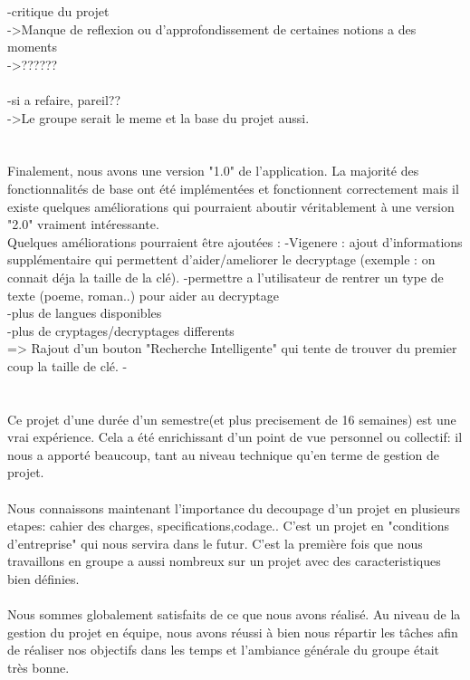 \documentclass[a4]{article}
\begin{document}
	-critique du projet \\
	->Manque de reflexion ou d'approfondissement de certaines notions a des moments \\
	->?????? \\ \\
	
	
		
	-si a refaire, pareil?? \\
	->Le groupe serait le meme et la base du projet aussi. \\ \\ \\
	
	
	Finalement, nous avons une version "1.0" de l’application. La majorité des fonctionnalités
de base ont été implémentées et fonctionnent correctement mais il existe quelques
améliorations qui pourraient aboutir véritablement à une version "2.0" vraiment intéressante. \\
Quelques améliorations pourraient être ajoutées :
-Vigenere : ajout d'informations supplémentaire qui permettent d'aider/ameliorer le decryptage 
(exemple : on connait déja la taille de la clé).
-permettre a l'utilisateur de rentrer un type de texte (poeme, roman..) pour aider au decryptage \\
-plus de langues disponibles \\
-plus de cryptages/decryptages differents \\
=> Rajout d'un bouton "Recherche Intelligente" qui tente de trouver du premier coup la taille de clé.
-\\ \\ \\

	
	
Ce projet d'une durée d'un semestre(et plus precisement de 16 semaines) est une vrai expérience.
Cela a été enrichissant d'un point de vue personnel ou collectif:
il nous a apporté beaucoup, tant au
niveau technique qu’en terme de gestion de projet.  \\  \\
Nous connaissons maintenant l'importance du decoupage d'un projet en plusieurs etapes: cahier des charges, specifications,codage..
C'est un projet en "conditions d'entreprise" qui nous servira dans le futur.
C’est la première fois que nous travaillons en groupe a aussi nombreux sur un projet avec des caracteristiques bien définies. \\ \\
Nous sommes globalement satisfaits de ce que nous avons réalisé.
 Au niveau de la gestion du projet en équipe, nous avons réussi à bien nous répartir les
tâches afin de réaliser nos objectifs dans les temps et l'ambiance générale du groupe était très
bonne. \\ \\ \\





	
	
	
\end{document}
